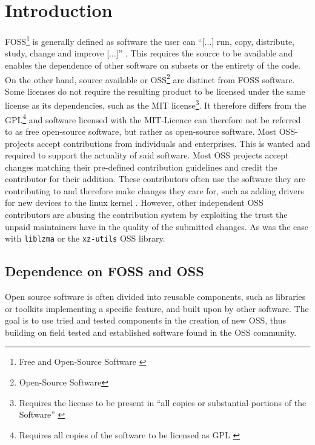 \section{Introduction}

FOSS\footnote{Free and Open-Source Software \cite{stallmann2021copyleft}} is
generally defined as software the user can ``[...] run, copy, distribute,
study, change and improve [...]'' \cite{fsf2024whycopylef}. This requires
the source to be available and enables the dependence of other software on
subsets or the entirety of the code. On the other hand, source available or
OSS\footnote{Open-Source Software} are distinct from FOSS software. Some
licenses do not require the resulting product to be licensed under the same
license as its dependencies, such as the MIT license\footnote{Requires the
license to be present in ``all copies or substantial portions of the
Software'' \cite{osorg2024mit}}. It therefore differs from the
GPL\footnote{Requires all copies of the software to be licensed as GPL
\cite{osorg2024gpl}} and software licensed with the MIT-Licence can
therefore not be referred to as free open-source software, but rather as
open-source software. \newline 
Most OSS-projects accept contributions from individuals and enterprises.
This is wanted and required to support the actuality of said software. Most
OSS projects accept changes matching their pre-defined contribution
guidelines and credit the contributor for their addition. These contributors
often use the software they are contributing to and therefore make changes
they care for, such as adding drivers for new devices to the linux kernel
\cite{linuxUnknownDevicedrivers}. However, other independent OSS
contributors are abusing the contribution system by exploiting the trust the
unpaid maintainers have in the quality of the submitted changes. As was the
case with \texttt{liblzma} or the \texttt{xz-utils} OSS library.

\subsection{Dependence on FOSS and OSS}

Open source software is often divided into reusable components, such as
libraries or toolkits implementing a specific feature, and built upon by other
software. The goal is to use tried and tested components in the creation of new
OSS, thus building on field tested and established software found in the OSS
community.


